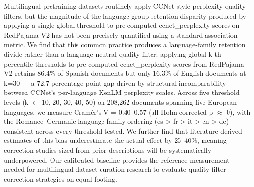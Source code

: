 
Multilingual pretraining datasets routinely apply CCNet-style perplexity quality filters, but the magnitude of the language-group retention disparity produced by applying a single global threshold to pre-computed ccnet\_perplexity scores on RedPajama-V2 has not been precisely quantified using a standard association metric. We find that this common practice produces a language-family retention divide rather than a language-neutral quality filter: applying global k-th percentile thresholds to pre-computed ccnet\_perplexity scores from RedPajama-V2 retains 86.4\% of Spanish documents but only 16.3\% of English documents at k=30 --- a 72.7 percentage-point gap driven by structural incomparability between CCNet's per-language KenLM perplexity scales. Across five threshold levels (k $\in$ {10, 20, 30, 40, 50}) on 208,262 documents spanning five European languages, we measure Cramér's V = 0.40--0.57 (all Holm-corrected p $\approx$ 0), with the Romance--Germanic language family ordering (es > fr > it > en > de) consistent across every threshold tested. We further find that literature-derived estimates of this bias underestimate the actual effect by 25--40\%, meaning correction studies sized from prior descriptions will be systematically underpowered. Our calibrated baseline provides the reference measurement needed for multilingual dataset curation research to evaluate quality-filter correction strategies on equal footing.

